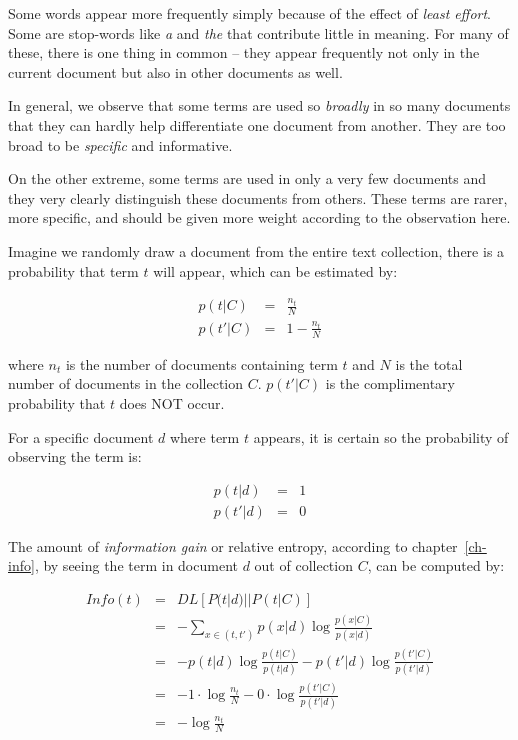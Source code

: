 \documentclass[
  letterpaper,
]{scrbook}
\begin{document}
Some words appear more frequently simply because of the effect of
\emph{least effort}. Some are stop-words like \emph{a} and \emph{the}
that contribute little in meaning. For many of these, there is one thing
in common -- they appear frequently not only in the current document but
also in other documents as well.

In general, we observe that some terms are used so \emph{broadly} in so
many documents that they can hardly help differentiate one document from
another. They are too broad to be \emph{specific} and informative.

On the other extreme, some terms are used in only a very few documents
and they very clearly distinguish these documents from others. These
terms are rarer, more specific, and should be given more weight
according to the observation here.

Imagine we randomly draw a document from the entire text collection,
there is a probability that term \(t\) will appear, which can be
estimated by:

\[\begin{aligned}
  p(t|C) & = & \frac{n_t}{N} \\
  p(t'|C) & = & 1 - \frac{n_t}{N}
\end{aligned}\]

where \(n_t\) is the number of documents containing term \(t\) and \(N\)
is the total number of documents in the collection \(C\). \(p(t'|C)\) is
the complimentary probability that \(t\) does NOT occur.

For a specific document \(d\) where term \(t\) appears, it is certain so
the probability of observing the term is:

\[\begin{aligned}
  p(t|d) & = & 1 \\
  p(t'|d) & = & 0
\end{aligned}\]

The amount of \emph{information gain} or relative entropy, according to
chapter~\hyperref[ch-info]{{[}ch-info{]}}, by seeing the term in
document \(d\) out of collection \(C\), can be computed by:

\[\begin{aligned}
  Info(t)
  & = & DL[P(t|d) || P(t|C)] \\
  & = & - \sum_{x \in (t,t')} p(x|d) \log \frac{p(x|C)}{p(x|d)} \\
  & = & - p(t|d) \log \frac{p(t|C)}{p(t|d)} - p(t'|d) \log \frac{p(t'|C)}{p(t'|d)} \\
  & = & - 1 \cdot \log \frac{n_t}{N} - 0 \cdot  \log \frac{p(t'|C)}{p(t'|d)} \\
  & = & - \log \frac{n_t}{N}
\end{aligned}\]
\end{document}
